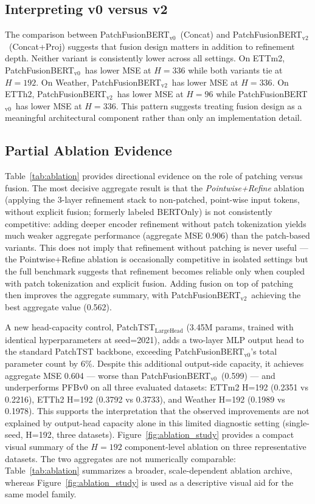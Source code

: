 \documentclass{ieeeaccess}
\newcommand{\modelvzero}{PatchFusionBERT$_{\text{v0}}$\xspace}
\newcommand{\modelvtwo}{PatchFusionBERT$_{\text{v2}}$\xspace}
\newcommand{\bertonly}{BERTOnly\xspace}
\begin{document}
\subsection{Interpreting v0 versus v2}
The comparison between \modelvzero\ (Concat) and \modelvtwo\ (Concat+Proj) suggests that
fusion design matters in addition to refinement depth. Neither variant is consistently
lower across all settings. On ETTm2, \modelvzero\ has lower MSE at $H=336$ while both variants tie at
$H=192$. On Weather, \modelvtwo\ has lower MSE at $H=336$. On ETTh2, \modelvtwo\ has lower MSE at
$H=96$ while \modelvzero\ has lower MSE at $H=336$. This pattern suggests treating fusion
design as a meaningful architectural component rather than only an implementation detail.

\subsection{Partial Ablation Evidence}
Table~\ref{tab:ablation} provides directional evidence on the role of patching versus
fusion. The most decisive aggregate result is that the \emph{Pointwise+Refine} ablation
(applying the 3-layer refinement stack to non-patched, point-wise input tokens, without
explicit fusion; formerly labeled \bertonly) is not consistently
competitive: adding deeper encoder refinement without patch tokenization yields much
weaker aggregate performance (aggregate MSE 0.906) than the patch-based variants.
This does not imply that refinement without patching is never useful --- the Pointwise+Refine ablation is
occasionally competitive in isolated settings but the full benchmark suggests that
refinement becomes reliable only when coupled with patch tokenization and explicit
fusion. Adding fusion on top of patching then improves the aggregate summary, with
\modelvtwo\ achieving the best aggregate value (0.562).

A new head-capacity control, PatchTST$_\text{LargeHead}$ (3.45M params, trained with
identical hyperparameters at seed=2021), adds a two-layer MLP output head to the
standard PatchTST backbone, exceeding \modelvzero's total parameter count by 6\%.
Despite this additional output-side capacity, it achieves aggregate MSE 0.604 ---
worse than \modelvzero\ (0.599) --- and underperforms PFBv0 on all three evaluated
datasets: ETTm2 H=192 (0.2351 vs 0.2216), ETTh2 H=192 (0.3792 vs 0.3733), and
Weather H=192 (0.1989 vs 0.1978). This supports the interpretation that the
observed improvements are not explained by output-head capacity alone in this
limited diagnostic setting (single-seed, H=192, three datasets). Figure~\ref{fig:ablation_study}
provides a compact visual summary of the $H=192$ component-level ablation on
three representative datasets. The two aggregates
are not numerically comparable: Table~\ref{tab:ablation} summarizes a broader,
scale-dependent ablation archive, whereas Figure~\ref{fig:ablation_study} is used
as a descriptive visual aid for the same model family.
\end{document}
